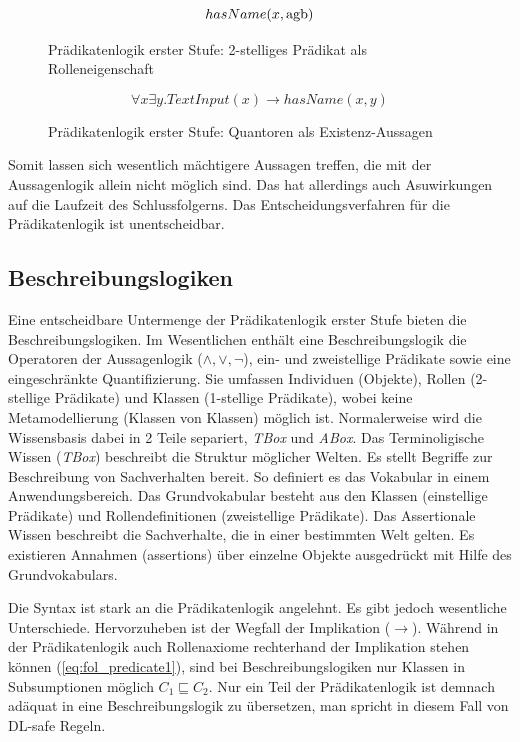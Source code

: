 \documentclass[runningheads,a4paper]{llncs}
\begin{document}
\begin{figure}
\begin{equation}
hasName(x, \textnormal{agb})
\label{eq:fol_predicate2}
\end{equation}
\caption{Prädikatenlogik erster Stufe: 2-stelliges Prädikat als Rolleneigenschaft}
\end{figure}

\begin{figure}
\begin{equation}
\forall x\exists y. TextInput(x) \to hasName(x, y)
\label{eq:fol_quantors}
\end{equation}
\caption{Prädikatenlogik erster Stufe: Quantoren als Existenz-Aussagen}
\end{figure}

Somit lassen sich wesentlich mächtigere Aussagen treffen, die mit der Aussagenlogik allein nicht möglich sind.
Das hat allerdings auch Asuwirkungen auf die Laufzeit des Schlussfolgerns.
Das Entscheidungsverfahren für die Prädikatenlogik ist unentscheidbar. 
\\

\subsection{Beschreibungslogiken}
\label{sec:desclogic}

Eine entscheidbare Untermenge der Prädikatenlogik erster Stufe bieten die Beschreibungslogiken.
Im Wesentlichen enthält eine Beschreibungslogik die Operatoren der Aussagenlogik (\(\land, \lor, \neg\)), ein- und zweistellige Prädikate sowie eine eingeschränkte Quantifizierung.
Sie umfassen Individuen (Objekte), Rollen (2-stellige Prädikate) und Klassen (1-stellige Prädikate), wobei keine Metamodellierung (Klassen von Klassen) möglich ist.
Normalerweise wird die Wissensbasis dabei in 2 Teile separiert, \textit{TBox} und \textit{ABox}. 
Das Terminoligische Wissen (\textit{TBox}) beschreibt die Struktur möglicher Welten. 
Es stellt Begriffe zur Beschreibung von Sachverhalten bereit. 
So definiert es das Vokabular in einem Anwendungsbereich. 
Das Grundvokabular besteht aus den Klassen (einstellige Prädikate) und Rollendefinitionen (zweistellige Prädikate). 
Das Assertionale Wissen beschreibt die Sachverhalte, die in einer bestimmten Welt gelten. 
Es existieren Annahmen (assertions) über einzelne Objekte ausgedrückt mit
Hilfe des Grundvokabulars.

Die Syntax ist stark an die Prädikatenlogik angelehnt. 
Es gibt jedoch wesentliche Unterschiede. 
Hervorzuheben ist der Wegfall der Implikation (\(\to\)). 
Während in der Prädikatenlogik auch Rollenaxiome rechterhand der Implikation stehen können (\eqref{eq:fol_predicate1}), sind bei Beschreibungslogiken nur Klassen in Subsumptionen möglich \(C_1 \sqsubseteq C_2\).
Nur ein Teil der Prädikatenlogik ist demnach adäquat in eine Beschreibungslogik zu übersetzen, man spricht in diesem Fall von DL-safe Regeln. 
\end{document}
